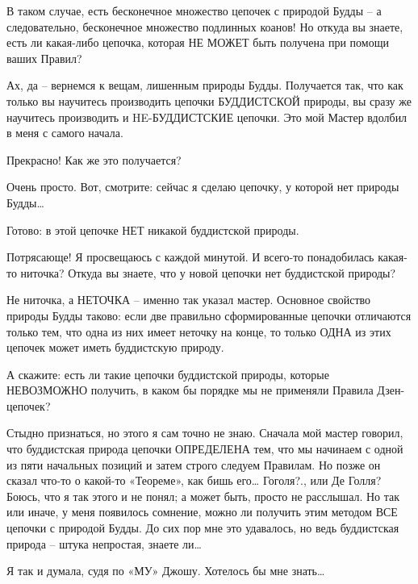 \documentclass[../main.tex]{subfiles}
\begin{document}
\begin{dialogue}
 В таком случае, есть бесконечное множество цепочек с природой Будды \--- а следовательно, бесконечное множество подлинных коанов! Но откуда вы знаете, есть ли какая-либо цепочка, которая НЕ МОЖЕТ быть получена при помощи ваших Правил?

 Ах, да \--- вернемся к вещам, лишенным природы Будды. Получается так, что как только вы научитесь производить цепочки БУДДИСТСКОЙ природы, вы сразу же научитесь производить и HE-БУДДИСТСКИЕ цепочки. Это мой Мастер вдолбил в меня с самого начала.

 Прекрасно! Как же это получается?

 Очень просто. Вот, смотрите: сейчас я сделаю цепочку, у которой нет природы Будды\ldots{}


Готово: в этой цепочке НЕТ никакой буддистской природы.

 Потрясающе! Я просвещаюсь с каждой минутой. И всего-то понадобилась какая-то ниточка? Откуда вы знаете, что у новой цепочки нет буддистской природы?

 Не ниточка, а НЕТОЧКА \--- именно так указал мастер. Основное свойство природы Будды таково: если две правильно сформированные цепочки отличаются только тем, что одна из них имеет неточку на конце, то только ОДНА из этих цепочек может иметь буддистскую природу.

 А скажите: есть ли такие цепочки буддистской природы, которые НЕВОЗМОЖНО получить, в каком бы порядке мы не применяли Правила Дзен-цепочек?

 Стыдно признаться, но этого я сам точно не знаю. Сначала мой мастер говорил, что буддистская природа цепочки ОПРЕДЕЛЕНА тем, что мы начинаем с одной из пяти начальных позиций и затем строго следуем Правилам. Но позже он сказал что-то о какой-то «Теореме», как бишь его\ldots{} Гоголя?., или Де Голля? Боюсь, что я так этого и не понял; а может быть, просто не расслышал. Но так или иначе, у меня появилось сомнение, можно ли получить этим методом ВСЕ цепочки с природой Будды. До сих пор мне это удавалось, но ведь буддистская природа \--- штука непростая, знаете ли\ldots{}

 Я так и думала, судя по «МУ» Джошу. Хотелось бы мне знать\ldots{}


\end{dialogue}
\end{document}

